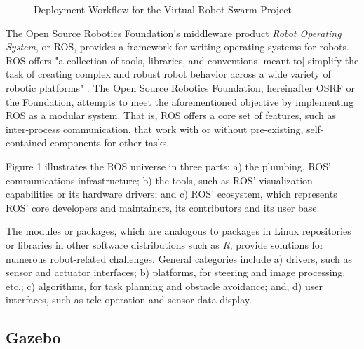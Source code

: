 \documentclass[9pt,twocolumn,twoside]{../../styles/osajnl}
\begin{document}
\begin{figure}[htbp]
\centering
{}
\caption{Deployment Workflow for the Virtual Robot Swarm Project}
\label{fig:deployWorkflow}
\end{figure}

The Open Source Robotics Foundation's middleware product \textit{Robot Operating System}, or ROS, provides a framework for writing operating systems for robots.  ROS offers "a collection of tools, libraries, and conventions [meant to] simplify the task of creating complex and robust robot behavior across a wide variety of robotic platforms" \cite{www-ros-about}. The Open Source Robotics Foundation, hereinafter OSRF or the Foundation, attempts to meet the aforementioned objective by implementing ROS as a modular system.  That is, ROS offers a core set of features, such as inter-process communication, that work with or without pre-existing, self-contained components for other tasks.

Figure 1 illustrates the ROS universe in three parts: a) the plumbing, ROS' communications infrastructure; b) the tools, such as ROS' visualization capabilities or its hardware drivers; and c) ROS' ecosystem, which represents ROS' core developers and maintainers, its contributors and its user base.

The modules or packages, which are analogous to packages in Linux repositories or libraries in other software distributions such as \textit{R}, provide solutions for numerous robot-related challenges.  General categories include a) drivers, such as sensor and actuator interfaces; b) platforms, for steering and image processing, etc.; c) algorithms, for task planning and obstacle avoidance; and, d) user interfaces, such as tele-operation and sensor data display. \cite{www-software-categories}

\subsection{Gazebo} %
\end{document}
